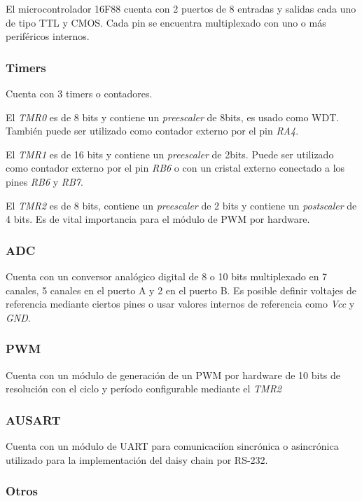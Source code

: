 \documentclass[a4paper,10pt]{article}
\begin{document}
El microcontrolador 16F88 cuenta con 2 puertos de 8 entradas y salidas cada uno de tipo TTL y CMOS.
Cada pin se encuentra multiplexado con uno o m\'as perif\'ericos internos.

\subsubsection{Timers}
\label{timers}

Cuenta con 3 timers o contadores.

El \emph{TMR0} es de 8 bits y contiene un \emph{preescaler} de 8bits, es usado como WDT.
Tambi\'en puede ser utilizado como contador externo por el pin \emph{RA4}.

El \emph{TMR1} es de 16 bits y contiene un \emph{preescaler} de 2bits.
Puede ser utilizado como contador externo por el pin \emph{RB6} o con un cristal externo conectado a los pines \emph{RB6} y \emph{RB7}.

El \emph{TMR2} es de 8 bits, contiene un \emph{preescaler} de 2 bits y contiene un \emph{postscaler} de 4 bits.
Es de vital importancia para el m\'odulo de PWM por hardware.

\subsubsection{ADC}
\label{adc}

Cuenta con un conversor anal\'ogico digital de 8 o 10 bits multiplexado en 7 canales, 5 canales en el puerto A y 2 en el puerto B.
Es posible definir voltajes de referencia mediante ciertos pines o usar valores internos de referencia como \emph{Vcc} y \emph{GND}.

\subsubsection{PWM}
\label{pwm}

Cuenta con un m\'odulo de generaci\'on de un PWM por hardware de 10 bits de resoluci\'on con el ciclo y per\'iodo configurable mediante el \emph{TMR2}

\subsubsection{AUSART}
\label{ausart}

Cuenta con un m\'odulo de UART para comunicaci\'ion sincr\'onica o asincr\'onica utilizado para la implementaci\'on del daisy chain por RS-232.

\subsubsection{Otros}
\label{otros}
\end{document}
